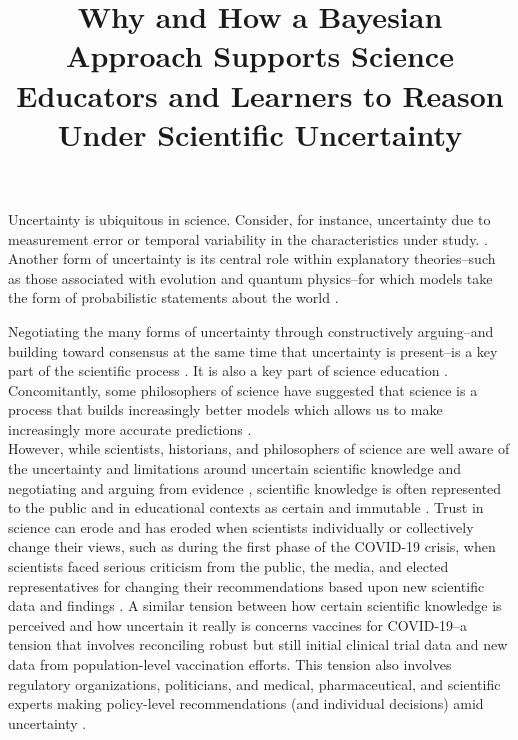 \documentclass[man, floatsintext]{apa7} %
\title{Why and How a Bayesian Approach Supports Science Educators and Learners to Reason Under Scientific Uncertainty}
\begin{document}
\maketitle

Uncertainty is ubiquitous in science. Consider, for instance, uncertainty due to measurement error or temporal variability in the characteristics under study.  \parencite{fuller2009measurement}. Another form of uncertainty is its central role within explanatory theories--such as those associated with evolution and quantum physics--for which models take the form of probabilistic statements about the world \parencite{g00}. 

Negotiating the many forms of uncertainty through constructively arguing--and building toward consensus at the same time that uncertainty is present--is a key part of the scientific process \parencite{g00}. It is also a key part of science education \parencite{duschl2008science, t00, nrc12, manz2018supporting, so12, n11}. Concomitantly, some philosophers of science have suggested that science is a process that builds increasingly better models which allows us to make increasingly more accurate predictions \parencite{g10,  n02, r77, lakatos1976falsification, feyerabend1993against, carnap1935philosophy, Kuhn1962}. \\

However, while scientists, historians, and philosophers of science are well aware of the uncertainty and limitations around uncertain scientific knowledge and negotiating and arguing from evidence \parencite{polanyi1962tacit, polanyi1966logic}, scientific knowledge is often represented to the public and in educational contexts as certain and immutable \parencite{d90, manz2018supporting, carey1993understanding}. Trust in science can erode and has eroded when scientists individually or collectively change their views, such as during the first phase of the COVID-19 crisis, when scientists faced serious criticism from the public, the media, and elected representatives for changing their recommendations based upon new scientific data and findings \parencite[]{vanderbleseffects2020,kreps_model_2020}. A similar tension between how certain scientific knowledge is perceived and how uncertain it really is concerns vaccines for COVID-19--a tension that involves reconciling robust but still initial clinical trial data and new data from population-level vaccination efforts. This tension also involves regulatory organizations, politicians, and medical, pharmaceutical, and scientific experts making policy-level recommendations (and individual decisions) amid uncertainty \parencite[]{vanderbleseffects2020, kreps_model_2020}. \\
\end{document}
